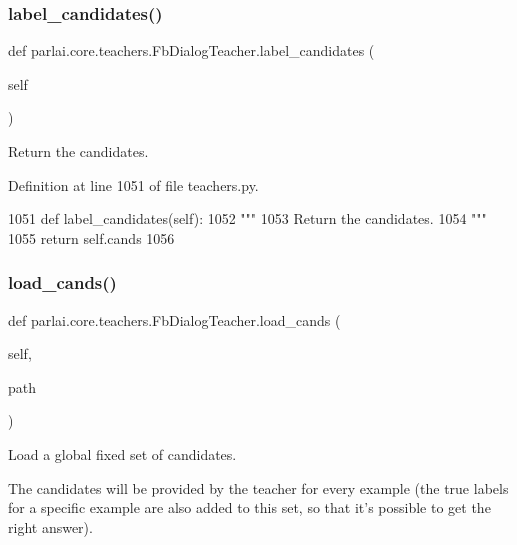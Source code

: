 \subsubsection{\texorpdfstring{label\+\_\+candidates()}{label\_candidates()}}
{\footnotesize\ttfamily def parlai.\+core.\+teachers.\+Fb\+Dialog\+Teacher.\+label\+\_\+candidates (\begin{DoxyParamCaption}\item[{}]{self }\end{DoxyParamCaption})}

\begin{DoxyVerb}Return the candidates.
\end{DoxyVerb}
 

Definition at line 1051 of file teachers.\+py.


\begin{DoxyCode}
1051     \textcolor{keyword}{def }label\_candidates(self):
1052         \textcolor{stringliteral}{"""}
1053 \textcolor{stringliteral}{        Return the candidates.}
1054 \textcolor{stringliteral}{        """}
1055         \textcolor{keywordflow}{return} self.cands
1056 
\end{DoxyCode}
\mbox{\label{classparlai_1_1core_1_1teachers_1_1FbDialogTeacher_ae6f10486ddf691ee868d33ea2c9dc295}} 
\subsubsection{\texorpdfstring{load\+\_\+cands()}{load\_cands()}}
{\footnotesize\ttfamily def parlai.\+core.\+teachers.\+Fb\+Dialog\+Teacher.\+load\+\_\+cands (\begin{DoxyParamCaption}\item[{}]{self,  }\item[{}]{path }\end{DoxyParamCaption})}

\begin{DoxyVerb}Load a global fixed set of candidates.

The candidates will be provided by the teacher for every example (the true
labels for a specific example are also added to this set, so that it's possible
to get the right answer).
\end{DoxyVerb}
 

